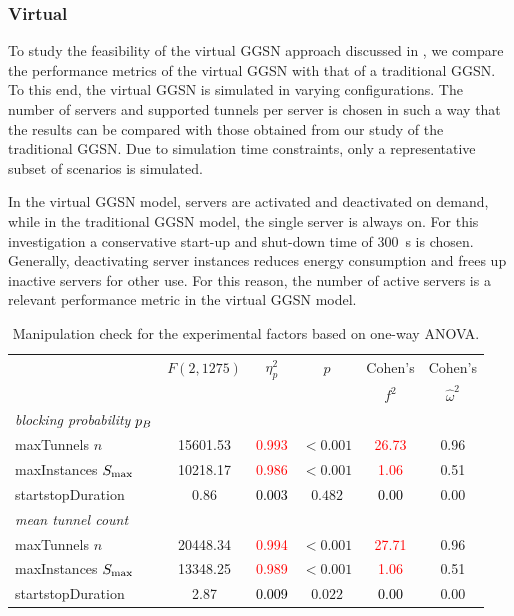 \subsubsection*{Virtual }\label{sec:cloud:virtualized_network_functions:performance_evaluation:virtual_ggsn}

To study the feasibility of the virtual \gls{GGSN} approach discussed in , we compare the performance metrics of the virtual \gls{GGSN} with that of a traditional \gls{GGSN}.
To this end, the virtual \gls{GGSN} is simulated in varying configurations.
The number of servers and supported tunnels per server is chosen in such a way that the results can be compared with those obtained from our study of the traditional \gls{GGSN}.
Due to simulation time constraints, only a representative subset of scenarios is simulated.

In the virtual \gls{GGSN} model, servers are activated and deactivated on demand, while in the traditional \gls{GGSN} model, the single server is always on.
For this investigation a conservative start-up and shut-down time of \SI{300}{\second} is chosen.
Generally, deactivating server instances reduces energy consumption and frees up inactive servers for other use.
For this reason, the number of active servers is a relevant performance metric in the virtual \gls{GGSN} model.

\begin{table}\caption{Manipulation check for the experimental factors based on one-way ANOVA.}
\centering
\label{tab:cloud:virtualized_network_functions:performance_evaluation:virtual_ggsn:manipulation}
\tabcolsep=0.11cm
\begin{tabular}{lccccc}
\toprule
& \(F(2,1275)\) & \(\eta^2_p\) & \(p\) & Cohen's & Cohen's\\ 
&  & & & \(f^2\) & \(\hat{\omega}^2\) \\ 
\midrule
\emph{blocking probability} \(p_B\)  & & & & &\\ 
maxTunnels \(n\)&  15601.53 & \textcolor{red}{0.993} & $<0.001$ & \textcolor{red}{26.73} & 0.96\\ 
maxInstances \(S_{\max}\)&  10218.17 & \textcolor{red}{0.986} & $<0.001$ & \textcolor{red}{1.06} & 0.51\\ 
startstopDuration &  0.86 & \textcolor{black}{0.003} & $0.482$ & \textcolor{black}{0.00} & 0.00\\ 
\midrule
\emph{mean tunnel count}  & & & & &\\ 
maxTunnels \(n\)&  20448.34 & \textcolor{red}{0.994} & $<0.001$ & \textcolor{red}{27.71} & 0.96\\ 
maxInstances \(S_{\max}\)&  13348.25 & \textcolor{red}{0.989} & $<0.001$ & \textcolor{red}{1.06} & 0.51\\ 
startstopDuration &  2.87 & \textcolor{black}{0.009} & $0.022$ & \textcolor{black}{0.00} & 0.00\\ 
\bottomrule
\end{tabular}
\end{table}

